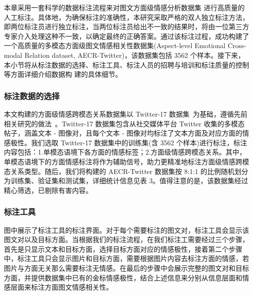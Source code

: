 本章采用一套科学的数据标注流程来对图文方面级情感分析数据集 进行高质量的人工标注。具体地，为确保标注的准确性，本研究采取严格的双人独立标注方法，即两位标注员进行独立标注，当两位标注员给出不一致的结果时，将由一位第三方专家介入处理这种不一致，以确定最终的正确答案。通过该标注过程，成功构建了一个高质量的多模态方面级图文情感相关性数据集(Aspect-level Emotional Cross-modal Relation dataset,   AECR-Twitter)，该数据集包括 3562 个样本。接下来，本小节将从标注数据的选择、标注工具、标注人员的招聘与培训和标注质量的控制等方面详细介绍数据构 建的具体细节。

\subsubsection{标注数据的选择}
本文构建的方面级情感跨模态关系数据集以 Twitter-17 数据集~\cite{yu2019adapting}为基础，遵循先前相关研究的做法~\cite{yu2022targeted,chen2023joint}。Twitter-17 数据集包含从社交媒体平台 Twitter 收集的多模态帖子，涵盖文本 - 图像对，且每个文本 - 图像对均标注了文本方面及对应方面的情感极性。我们选取 Twitter-17 数据集中的训练集(含 3562 个样本)进行标注，标注内容包括：1.单模态语境下各方面的情感标签；2.方面级情感跨模态关系。其中，单模态语境下的方面情感标注将作为辅助信号，助力更精准地标注方面级情感跨模态关系类型。随后，我们将构建的 AECR-Twitter 数据集按 8:1:1 的比例随机划分为训练集、验证集和测试集，详细统计信息见表 3。值得注意的是，该数据集经过精心筛选，已剔除有害内容。

\subsubsection{标注工具}
图中展示了标注工具的标注界面。对于每个需要标注的图文对，标注工具会显示该图文对以及目标方面。当根据我们的标注流程，在我们标注工需要经过三个步骤，首先是只显示文本和目标方面，选择目标方面对应的情感极性，接着第二个步骤中，标注工具只会显示图片和目标方面，需要根据图片内容去标注方面的情感，若图片与方面无关那么需要标注无情感。在最后的步骤中会展示完整的图文对和目标方面，并提供数据集中已有的金标情感极性，结合上述信息来分别从信息层面和情感层面来标注方面图文情感相关性。

